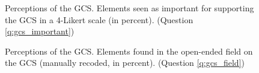 \documentclass[12pt,english]{article}
\begin{document}
\begin{figure}[h!]
    \caption[Perceptions of the GCS]{Perceptions of the GCS. Elements seen as important for supporting the GCS in a 4-Likert scale (in percent). (Question \ref{q:gcs_important})}\label{fig:gcs_important}
\end{figure}

\begin{figure}[h!]
    \caption[Classification of open-ended field on the GCS]{Perceptions of the GCS. Elements found in the open-ended field on the GCS (manually recoded, in percent). (Question \ref{q:gcs_field})}\label{fig:gcs_field}
\end{figure}
\end{document}
